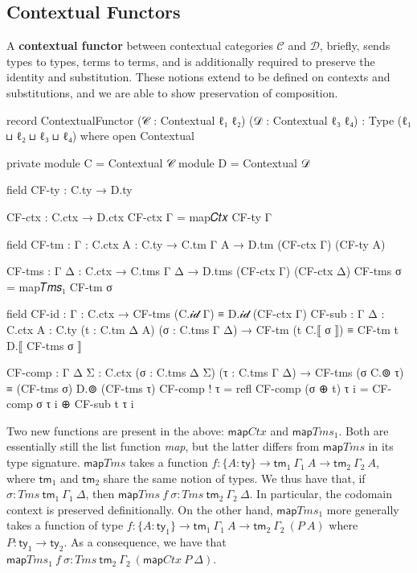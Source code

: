 \subsection{Contextual Functors}

A \textbf{contextual functor} between contextual categories $\mathcal{C}$ and
$\mathcal{D}$, briefly, sends types to types, terms to terms, and is
additionally required to preserve the identity and substitution. These notions
extend to be defined on contexts and substitutions, and we are able to show
preservation of composition.

\begin{code}
record ContextualFunctor (𝒞 : Contextual ℓ₁ ℓ₂) (𝒟 : Contextual ℓ₃ ℓ₄)
       : Type (ℓ₁ ⊔ ℓ₂ ⊔ ℓ₃ ⊔ ℓ₄) where
  open Contextual

  private
    module C = Contextual 𝒞
    module D = Contextual 𝒟

  field
    CF-ty : C.ty → D.ty

  CF-ctx : C.ctx → D.ctx
  CF-ctx Γ = map𝐶𝑡𝑥 CF-ty Γ

  field
    CF-tm : {Γ : C.ctx} {A : C.ty} → C.tm Γ A → D.tm (CF-ctx Γ) (CF-ty A)

  CF-tms : {Γ Δ : C.ctx} → C.tms Γ Δ → D.tms (CF-ctx Γ) (CF-ctx Δ)
  CF-tms σ = map𝑇𝑚𝑠₁ CF-tm σ

  field
    CF-id : {Γ : C.ctx} → CF-tms (C.𝒾𝒹 Γ) ≡ D.𝒾𝒹 (CF-ctx Γ)
    CF-sub : {Γ Δ : C.ctx} {A : C.ty} (t : C.tm Δ A) (σ : C.tms Γ Δ) →
      CF-tm (t C.⟦ σ ⟧) ≡ CF-tm t D.⟦ CF-tms σ ⟧

  CF-comp : {Γ Δ Σ : C.ctx} (σ : C.tms Δ Σ) (τ : C.tms Γ Δ) →
    CF-tms (σ C.⊚ τ) ≡ (CF-tms σ) D.⊚ (CF-tms τ)
  CF-comp ! τ = refl
  CF-comp (σ ⊕ t) τ i = CF-comp σ τ i ⊕ CF-sub t τ i
\end{code}

Two new functions are present in the above: $\mathsf{map}\mathit{Ctx}$ and
$\mathsf{map}\mathit{Tms}_\mathit{1}$. Both are essentially still the list
function \emph{map}, but the latter differs from $\mathsf{map}\mathit{Tms}$ in
its type signature. $\mathsf{map}\mathit{Tms}$ takes a function $f : \{A :
\mathsf{ty}\} \to \mathsf{tm}_\mathit{1}~\Gamma_\mathit{1}~A \to
\mathsf{tm}_\mathit{2}~\Gamma_\mathit{2}~A$, where $\mathsf{tm}_\mathit{1}$ and
$\mathsf{tm}_\mathit{2}$ share the same notion of types. We thus have that, if
$\sigma : \mathit{Tms}~\mathsf{tm}_\mathit{1}~\Gamma_\mathit{1}~\Delta$, then
$\mathsf{map}\mathit{Tms}~f~\sigma : \mathit{Tms}~\mathsf{tm}_\mathit{2}
~\Gamma_\mathit{2}~\Delta$. In particular, the codomain context is preserved
definitionally. On the other hand, $\mathsf{map}\mathit{Tms}_\mathit{1}$ more
generally takes a function of type $f : \{A : \mathsf{ty}_\mathit{1}\} \to
\mathsf{tm}_\mathit{1}~\Gamma_\mathit{1}~A \to \mathsf{tm}_\mathit{2}~\Gamma
_\mathit{2}~(P~A)$ where $P : \mathsf{ty}_\mathit{1} \to \mathsf{ty}
_\mathit{2}$. As a consequence, we have that $\mathsf{map}\mathit{Tms}
_\mathit{1}~f~\sigma : \mathit{Tms}~\mathsf{tm}_\mathit{2}~\Gamma_\mathit{2}
~(\mathsf{map}\mathit{Ctx}~P~\Delta)$.

